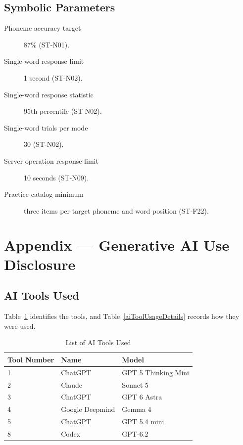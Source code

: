 \documentclass[12pt, titlepage]{article}
\newcommand{\PhonemeAccuracyTarget}{87\%}
\newcommand{\WordLatencyLimit}{1 second}
\newcommand{\WordLatencyPercentile}{95th percentile}
\newcommand{\WordLatencyRuns}{30}
\newcommand{\ServerResponseLimit}{10 seconds}
\newcommand{\PracticeItemMinimum}{three}
\begin{document}
\subsection{Symbolic Parameters}

\begin{description}
    \item[Phoneme accuracy target] \PhonemeAccuracyTarget{} (ST-N01).
    \item[Single-word response limit] \WordLatencyLimit{} (ST-N02).
    \item[Single-word response statistic] \WordLatencyPercentile{} (ST-N02).
    \item[Single-word trials per mode] \WordLatencyRuns{} (ST-N02).
    \item[Server operation response limit] \ServerResponseLimit{} (ST-N09).
    \item[Practice catalog minimum] \PracticeItemMinimum{} items per target phoneme and word position (ST-F22).
\end{description}

\newpage{}

\section{Appendix --- Generative AI Use Disclosure}

\subsection{AI Tools Used}

Table~\ref{aiToolsUsed} identifies the tools, and
Table~\ref{aiToolUsageDetails} records how they were used.

\begin{table}[hp]
\caption{List of AI Tools Used} \label{aiToolsUsed}
\begin{tabularx}{\textwidth}{llX}
\toprule
\textbf{Tool Number} & \textbf{Name} & \textbf{Model} \\
\midrule
1 & ChatGPT & GPT 5 Thinking Mini \\
2 & Claude & Sonnet 5 \\
3 & ChatGPT & GPT 6 Astra \\
4 & Google Deepmind & Gemma 4 \\
5 & ChatGPT & GPT 5.4 mini \\
8 & Codex & GPT-6.2 \\
\bottomrule
\end{tabularx}
\end{table}
\end{document}
